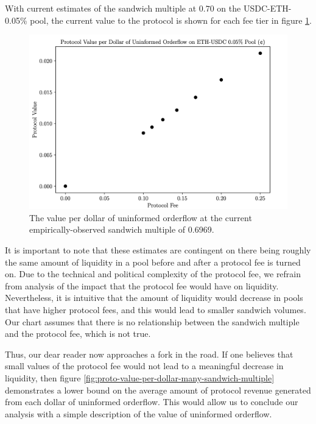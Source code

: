     With current estimates of the sandwich multiple at $0.70$ on the USDC-ETH-0.05\% pool, the current value to the protocol is shown for each fee tier in figure \ref{fig:proto-value-per-dollar-current}.

    \begin{figure}[ht]
        \centering
        \includegraphics[scale=.33]{figs/protocol-value-vs-fee-current.png}
        \caption{The value per dollar of uninformed orderflow at the current empirically-observed sandwich multiple of 0.6969.}
        \label{fig:proto-value-per-dollar-current}
    \end{figure}

    It is important to note that these estimates are contingent on there being roughly the same amount of liquidity in a pool before and after a protocol fee is turned on. Due to the technical and political complexity of the protocol fee, we refrain from analysis of the impact that the protocol fee would have on liquidity. Nevertheless, it is intuitive that the amount of liquidity would decrease in pools that have higher protocol fees, and this would lead to smaller sandwich volumes. Our chart assumes that there is no relationship between the sandwich multiple and the protocol fee, which is not true.

    Thus, our dear reader now approaches a fork in the road. If one believes that small values of the protocol fee would not lead to a meaningful decrease in liquidity, then figure \ref{fig:proto-value-per-dollar-many-sandwich-multiple} demonstrates a lower bound on the average amount of protocol revenue generated from each dollar of uninformed orderflow. This would allow us to conclude our analysis with a simple description of the value of uninformed orderflow.

